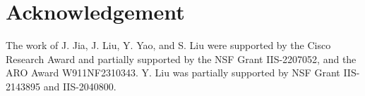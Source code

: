 \section{Acknowledgement}

{The work of J. Jia, J. Liu, Y. Yao, and S. Liu were supported by the Cisco Research Award and partially supported by the NSF Grant IIS-2207052, and the ARO Award W911NF2310343. Y. Liu was partially supported by NSF Grant IIS-2143895 and IIS-2040800. }